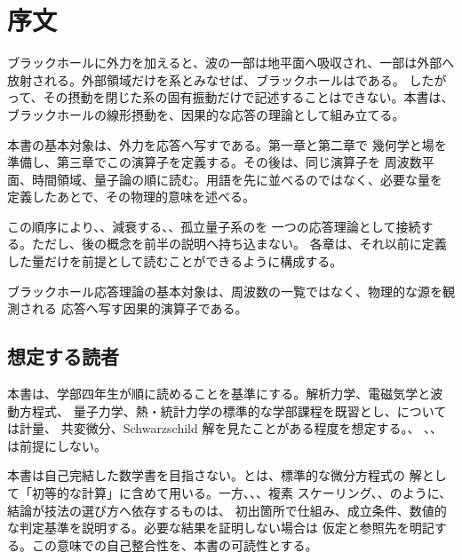 \chapter*{序文}


ブラックホールに外力を加えると、波の一部は地平面へ吸収され、一部は外部へ
放射される。外部領域だけを系とみなせば、ブラックホールはである。
したがって、その摂動を閉じた系の固有振動だけで記述することはできない。本書は、
ブラックホールの線形摂動を、因果的な応答の理論として組み立てる。

本書の基本対象は、外力を応答へ写すである。第一章と第二章で
幾何学と場を準備し、第三章でこの演算子を定義する。その後は、同じ演算子を
周波数平面、時間領域、量子論の順に読む。用語を先に並べるのではなく、必要な量を
定義したあとで、その物理的意味を述べる。

この順序により、、減衰する、、孤立量子系のを
一つの応答理論として接続する。ただし、後の概念を前半の説明へ持ち込まない。
各章は、それ以前に定義した量だけを前提として読むことができるように構成する。

\begin{principlebox}
ブラックホール応答理論の基本対象は、周波数の一覧ではなく、物理的な源を観測される
応答へ写す因果的演算子である。
\end{principlebox}

\section*{想定する読者}

本書は、学部四年生が順に読めることを基準にする。解析力学、電磁気学と波動方程式、
量子力学、熱・統計力学の標準的な学部課程を既習とし、については計量、
共変微分、Schwarzschild 解を見たことがある程度を想定する。、
、、 は前提にしない。

本書は自己完結した数学書を目指さない。とは、標準的な微分方程式の
解として「初等的な計算」に含めて用いる。一方、、、複素
スケーリング、、のように、結論が技法の選び方へ依存するものは、
初出箇所で仕組み、成立条件、数値的な判定基準を説明する。必要な結果を証明しない場合は
仮定と参照先を明記する。この意味での自己整合性を、本書の可読性とする。


